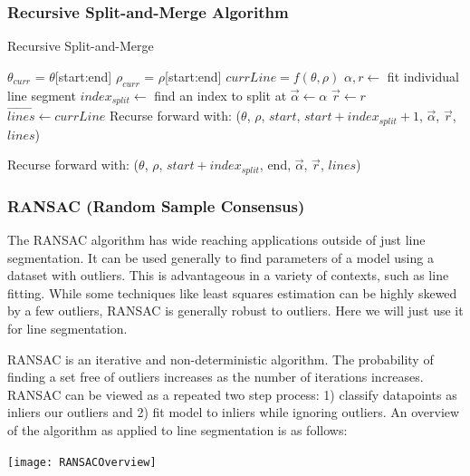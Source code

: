 \documentclass[twoside]{article}
\begin{document}
\subsubsection{Recursive Split-and-Merge Algorithm}
\begin{algorithm}
\caption{Recursive Split-and-Merge}\label{euclid}
\begin{algorithmic}[1]

\State $\theta_{curr}$ = $\theta$[start:end]
\State $\rho_{curr}$ = $\rho$[start:end]
\State $currLine = f(\theta, \rho)$
\State    $\alpha, r \gets$ fit individual line segment
\State    $index_{split} \gets$ find an index to split at
\State $\vec{\alpha} \gets \alpha$
\State $\vec{r} \gets r$
\State $\vec{lines} \gets currLine$
\Else
\State Recurse forward with: ($\theta$, $\rho$, $start$, $start + index_{split} + 1$,  $\vec{\alpha}$, $\vec{r}$, $lines$)

\State Recurse forward with: ($\theta$, $\rho$, $start + index_{split}$, end,  $\vec{\alpha}$, $\vec{r}$, $lines$)
\EndIf
\EndProcedure
\end{algorithmic}
\end{algorithm}


\subsubsection{RANSAC (Random Sample Consensus)}
The RANSAC algorithm has wide reaching applications outside of just line segmentation. It can be used generally to find parameters of a model using a dataset with outliers. This is advantageous in a variety of contexts, such as line fitting. While some techniques like least squares estimation can be highly skewed by a few outliers, RANSAC is generally robust to outliers. Here we will just use it for line segmentation.

RANSAC is an iterative and non-deterministic algorithm. The probability of finding a set free of outliers increases as the number of iterations increases. RANSAC can be viewed as a repeated two step process: 1) classify datapoints as inliers our outliers and 2) fit model to inliers while ignoring outliers. An overview of the algorithm as applied to line segmentation is as follows:
\begin{center}
	\texttt{[image: RANSACOverview]}
\end{center}
\end{document}
